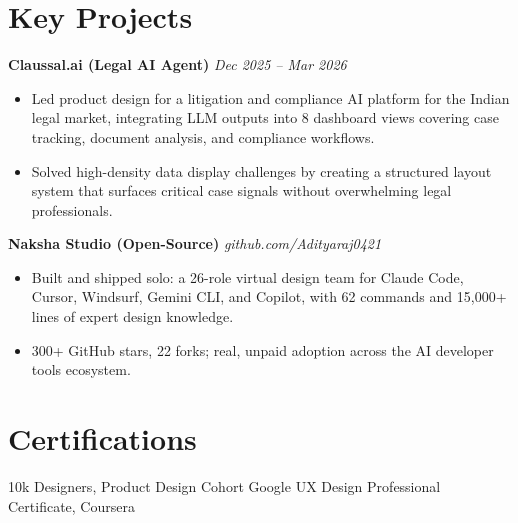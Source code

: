\documentclass[a4paper,10pt]{article}
\begin{document}
\section{Key Projects}

\noindent
\textbf{Claussal.ai (Legal AI Agent)} \hfill \textit{Dec 2025 -- Mar 2026}
\begin{itemize}[noitemsep, topsep=0pt, leftmargin=1.5em]
    \item Led product design for a litigation and compliance AI platform for the Indian legal market, integrating LLM outputs into 8 dashboard views covering case tracking, document analysis, and compliance workflows.
    \item Solved high-density data display challenges by creating a structured layout system that surfaces critical case signals without overwhelming legal professionals.
\end{itemize}
\vspace{4pt}

\noindent
\textbf{Naksha Studio (Open-Source)} \hfill \textit{github.com/Adityaraj0421}
\begin{itemize}[noitemsep, topsep=0pt, leftmargin=1.5em]
    \item Built and shipped solo: a 26-role virtual design team for Claude Code, Cursor, Windsurf, Gemini CLI, and Copilot, with 62 commands and 15,000+ lines of expert design knowledge.
    \item 300+ GitHub stars, 22 forks; real, unpaid adoption across the AI developer tools ecosystem.
\end{itemize}
\vspace{4pt}

\section{Certifications}
\noindent 10k Designers, Product Design Cohort \quad\textperiodcentered\quad Google UX Design Professional Certificate, Coursera

\end{document}

